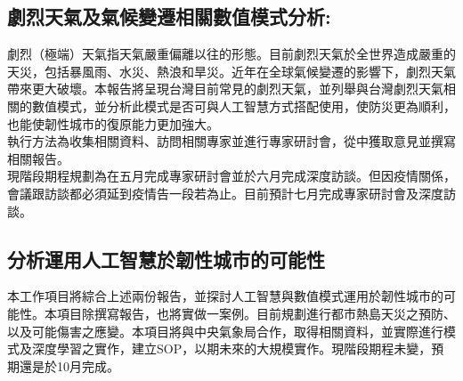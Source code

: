 \documentclass[a4paper,12pt]{article}
\begin{document}
\subsection{劇烈天氣及氣候變遷相關數值模式分析:}
\label{sec:org1715edc}
劇烈（極端）天氣指天氣嚴重偏離以往的形態。目前劇烈天氣於全世界造成嚴重的天災，包括暴風雨、水災、熱浪和旱災。近年在全球氣候變遷的影響下，劇烈天氣帶來更大破壞。本報告將呈現台灣目前常見的劇烈天氣，並列舉與台灣劇烈天氣相關的數值模式，並分析此模式是否可與人工智慧方式搭配使用，使防災更為順利，也能使韌性城市的復原能力更加強大。\\
執行方法為收集相關資料、訪問相關專家並進行專家研討會，從中獲取意見並撰寫相關報告。\\
現階段期程規劃為在五月完成專家研討會並於六月完成深度訪談。但因疫情關係，會議跟訪談都必須延到疫情告一段若為止。目前預計七月完成專家研討會及深度訪談。\\
\subsection{分析運用人工智慧於韌性城市的可能性}
\label{sec:orgd7d8103}
本工作項目將綜合上述兩份報告，並探討人工智慧與數值模式運用於韌性城市的可能性。本項目除撰寫報告，也將實做一案例。目前規劃進行都市熱島天災之預防、以及可能傷害之應變。本項目將與中央氣象局合作，取得相關資料，並實際進行模式及深度學習之實作，建立SOP，以期未來的大規模實作。現階段期程未變，預期還是於10月完成。\\

\newpage
\end{document}
